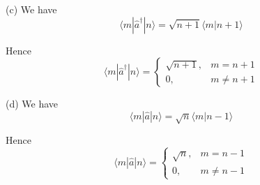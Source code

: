 (c) We have
\begin{equation*}
\langle m|\hat a^\dag|n\rangle
=\sqrt{n+1}\langle m|n+1\rangle
\end{equation*}

Hence
\begin{equation*}
\langle m|\hat a^\dag|n\rangle
=\begin{cases}
\sqrt{n+1}, & m=n+1
\\
0, & m\ne n+1
\end{cases}
\end{equation*}

(d) We have
\begin{equation*}
\langle m|\hat a|n\rangle
=\sqrt n\langle m|n-1\rangle
\end{equation*}

Hence
\begin{equation*}
\langle m|\hat a|n\rangle
=\begin{cases}
\sqrt n, & m=n-1
\\
0, & m\ne n-1
\end{cases}
\end{equation*}


